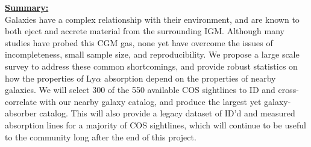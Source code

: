 \documentclass[12pt]{article}
\begin{document}
\noindent \underline{\textbf{Summary: }}\\
\indent Galaxies have a complex relationship with their environment, and are known to both eject and accrete material from the surrounding IGM. Although many studies have probed this CGM gas, none yet have overcome the issues of incompleteness, small sample size, and reproducibility. We propose a large scale survey to address these common shortcomings, and provide robust statistics on how the properties of Ly$\alpha$ absorption depend on the properties of nearby galaxies. We will select 300 of the 550 available COS sightlines to ID and cross-correlate with our nearby galaxy catalog, and produce the largest yet galaxy-absorber catalog. This will also provide a legacy dataset of ID'd and measured absorption lines for a majority of COS sightlines, which will continue to be useful to the community long after the end of this project.\\


%



\end{document}
